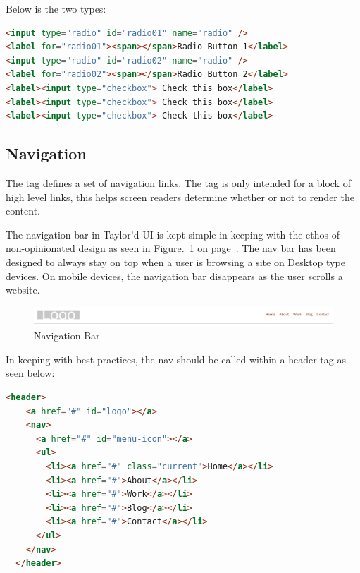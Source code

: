 Below is the two types: 

\begin{lstlisting}[language=HTML]
<input type="radio" id="radio01" name="radio" />
<label for="radio01"><span></span>Radio Button 1</label>
<input type="radio" id="radio02" name="radio" />
<label for="radio02"><span></span>Radio Button 2</label>
<label><input type="checkbox"> Check this box</label>
<label><input type="checkbox"> Check this box</label>
<label><input type="checkbox"> Check this box</label>
\end{lstlisting}

\newpage
\subsection*{Navigation}

The  tag defines a set of navigation links. The  tag is only intended for a block of high level links, this helps screen readers determine whether or not to render the content.

The navigation bar in Taylor'd UI is kept simple in keeping with the ethos of non-opinionated design as seen in Figure.~\ref{fig:nav} on  page~\pageref{fig:nav}. The nav bar has been designed to always stay on top when a user is browsing a site on Desktop type devices. On mobile devices, the navigation bar disappears as the user scrolls a website. 

\begin{figure}[h]
\centering
  \includegraphics[scale=0.2]{images/nav}
  \caption{Navigation Bar}
  \label{fig:nav}
\end{figure} 

In keeping with best practices, the nav should be called within a header tag as seen below:

\begin{lstlisting}[language=HTML]
  <header>
    <a href="#" id="logo"></a>
    <nav>
      <a href="#" id="menu-icon"></a>
      <ul>
        <li><a href="#" class="current">Home</a></li>
        <li><a href="#">About</a></li>
        <li><a href="#">Work</a></li>
        <li><a href="#">Blog</a></li>
        <li><a href="#">Contact</a></li>
      </ul>
    </nav>
  </header>
\end{lstlisting}

\newpage

